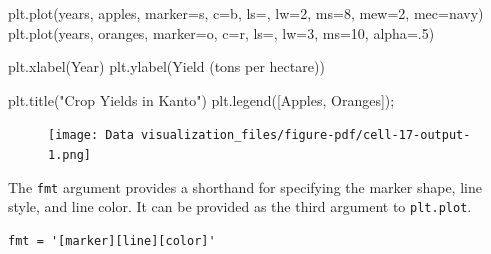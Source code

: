 \documentclass[
  letterpaper,
  DIV=11,
  numbers=noendperiod]{scrreprt}
\newenvironment{Shaded}{\begin{snugshade}}{\end{snugshade}}
\newcommand{\DecValTok}[1]{\textcolor[rgb]{0.68,0.00,0.00}{#1}}
\newcommand{\FloatTok}[1]{\textcolor[rgb]{0.68,0.00,0.00}{#1}}
\newcommand{\NormalTok}[1]{\textcolor[rgb]{0.00,0.23,0.31}{#1}}
\newcommand{\OperatorTok}[1]{\textcolor[rgb]{0.37,0.37,0.37}{#1}}
\newcommand{\StringTok}[1]{\textcolor[rgb]{0.13,0.47,0.30}{#1}}
\begin{document}
\begin{Shaded}
\begin{Highlighting}[]
\NormalTok{plt.plot(years, apples, marker}\OperatorTok{=}\StringTok{\textquotesingle{}s\textquotesingle{}}\NormalTok{, c}\OperatorTok{=}\StringTok{\textquotesingle{}b\textquotesingle{}}\NormalTok{, ls}\OperatorTok{=}\StringTok{\textquotesingle{}{-}\textquotesingle{}}\NormalTok{, lw}\OperatorTok{=}\DecValTok{2}\NormalTok{, ms}\OperatorTok{=}\DecValTok{8}\NormalTok{, mew}\OperatorTok{=}\DecValTok{2}\NormalTok{, mec}\OperatorTok{=}\StringTok{\textquotesingle{}navy\textquotesingle{}}\NormalTok{)}
\NormalTok{plt.plot(years, oranges, marker}\OperatorTok{=}\StringTok{\textquotesingle{}o\textquotesingle{}}\NormalTok{, c}\OperatorTok{=}\StringTok{\textquotesingle{}r\textquotesingle{}}\NormalTok{, ls}\OperatorTok{=}\StringTok{\textquotesingle{}{-}{-}\textquotesingle{}}\NormalTok{, lw}\OperatorTok{=}\DecValTok{3}\NormalTok{, ms}\OperatorTok{=}\DecValTok{10}\NormalTok{, alpha}\OperatorTok{=}\FloatTok{.5}\NormalTok{)}

\NormalTok{plt.xlabel(}\StringTok{\textquotesingle{}Year\textquotesingle{}}\NormalTok{)}
\NormalTok{plt.ylabel(}\StringTok{\textquotesingle{}Yield (tons per hectare)\textquotesingle{}}\NormalTok{)}

\NormalTok{plt.title(}\StringTok{"Crop Yields in Kanto"}\NormalTok{)}
\NormalTok{plt.legend([}\StringTok{\textquotesingle{}Apples\textquotesingle{}}\NormalTok{, }\StringTok{\textquotesingle{}Oranges\textquotesingle{}}\NormalTok{])}\OperatorTok{;}
\end{Highlighting}
\end{Shaded}

\begin{figure}[H]

{\centering \texttt{[image: Data visualization\_files/figure-pdf/cell-17-output-1.png]}

}

\end{figure}

The \texttt{fmt} argument provides a shorthand for specifying the marker
shape, line style, and line color. It can be provided as the third
argument to \texttt{plt.plot}.

\begin{verbatim}
fmt = '[marker][line][color]'
\end{verbatim}
\end{document}
